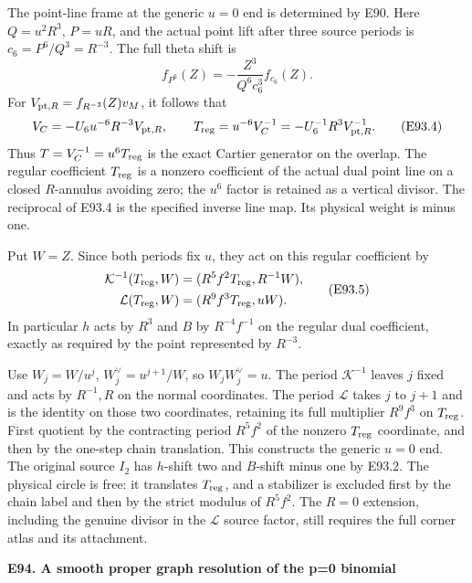 The point-line frame at the generic \(u=0\) end is
determined by E90. Here \(Q=u^2R^3\), \(P=uR\), and
the actual point lift after three source periods is
\(c_6=P^6/Q^3=R^{-3}\). The full theta shift is
\[
 f_{P^6}(Z)=-\frac{Z^3}{Q^6c_6^3}f_{c_6}(Z).     \tag{E93.3}
\]
For \(V_{{\rm pt},R}=f_{R^{-3}}(Z)v_M\), it follows that
\[
 V_C=-U_6u^{-6}R^{-3}V_{{\rm pt},R},\qquad
 T_{\rm reg}=u^{-6}V_C^{-1}
       =-U_6^{-1}R^3 V_{{\rm pt},R}^{-1}.        \tag{E93.4}
\]
Thus \(T=V_C^{-1}=u^6T_{\rm reg}\) is the exact
Cartier generator on the overlap. The regular coefficient
\(T_{\rm reg}\) is a nonzero coefficient of the actual
dual point line on a closed \(R\)-annulus avoiding zero;
the \(u^6\) factor is retained as a vertical divisor.
The reciprocal of E93.4 is the specified inverse line
map. Its physical weight is minus one.

Put \(W=Z\). Since both periods fix \(u\), they act
on this regular coefficient by
\[
\begin{aligned}
 \mathcal K^{-1}(T_{\rm reg},W)
   &=(R^5f^2T_{\rm reg},R^{-1}W),\\
 \mathcal L(T_{\rm reg},W)
   &=(R^9f^3T_{\rm reg},uW).
\end{aligned}                                                   \tag{E93.5}
\]
In particular \(h\) acts by \(R^3\) and \(B\) by
\(R^{-4}f^{-1}\) on the regular dual coefficient,
exactly as required by the point represented by \(R^{-3}\).

Use \(W_j=W/u^j\), \(W_j^\vee=u^{j+1}/W\), so
\(W_jW_j^\vee=u\). The period \(\mathcal K^{-1}\)
leaves \(j\) fixed and acts by \(R^{-1},R\) on the
normal coordinates. The period \(\mathcal L\) takes
\(j\) to \(j+1\) and is the identity on those two
coordinates, retaining its full multiplier \(R^9f^3\)
on \(T_{\rm reg}\). First quotient by the contracting
period \(R^5f^2\) of the nonzero \(T_{\rm reg}\)
coordinate, and then by the one-step chain translation.
This constructs the generic \(u=0\) end. The original
source \(I_2\) has \(h\)-shift two and \(B\)-shift minus
one by E93.2. The physical circle is free: it translates
\(T_{\rm reg}\), and a stabilizer is excluded first
by the chain label and then by the strict modulus of
\(R^5f^2\). The \(R=0\) extension, including the
genuine divisor in the \(\mathcal L\) source factor,
still requires the full corner atlas and its attachment.

\par

\medskip\noindent\textbf{E94. A smooth proper graph resolution of the p=0 binomial}

